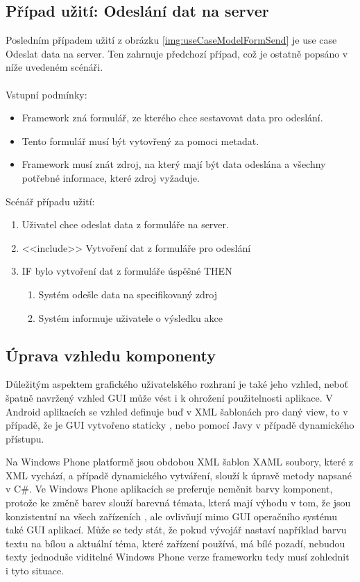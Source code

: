 \subsection{Případ užití: Odeslání dat na server}
Posledním případem užití z obrázku \ref{img:useCaseModelFormSend} je use case Odeslat data na server. Ten zahrnuje předchozí případ, což je ostatně popsáno v níže uvedeném scénáři.\\\\
Vstupní podmínky:
\begin{itemize}
\item Framework zná formulář, ze kterého chce sestavovat data pro odeslání.
\item Tento formulář musí být vytovřený za pomoci metadat.
\item Framework musí znát zdroj, na který mají být data odeslána a všechny potřebné informace, které zdroj vyžaduje. 
\end{itemize}
Scénář případu užití:
\begin{enumerate}
\item Uživatel chce odeslat data z formuláře na server.
\item <<include>> Vytvoření dat z formuláře pro odeslání
\item IF bylo vytvoření dat z formuláře úspěšné THEN	 
\begin{enumerate}
\item Systém odešle data na specifikovaný zdroj
\item Systém informuje uživatele o výsledku akce
\end{enumerate}
\end{enumerate}

\subsection{Úprava vzhledu komponenty}
Důležitým aspektem grafického uživatelského rozhraní je také jeho vzhled, neboť špatně navržený vzhled GUI může vést i k ohrožení použitelnosti aplikace. V Android aplikacích se vzhled definuje buď v XML šablonách pro daný view, to v případě, že je GUI vytvořeno staticky \cite{android-themes}, nebo pomocí Javy v případě dynamického přístupu. 

Na Windows Phone platformě jsou obdobou XML šablon XAML soubory, které z XML vychází, a případě dynamického vytváření, slouží k úpravě metody napsané v C\#. Ve Windows Phone aplikacích se preferuje neměnit barvy komponent, protože ke změně barev slouží barevná témata, která mají výhodu v tom, že jsou konzistentní na všech zařízeních \cite{wp-themes}, ale ovlivňují mimo GUI operačního systému také GUI aplikací. Může se tedy stát, že pokud vývojář nastaví například barvu textu na bílou a aktuální téma, které zařízení používá, má bílé pozadí, nebudou texty jednoduše viditelné Windows Phone verze frameworku tedy musí zohlednit i tyto situace.  

